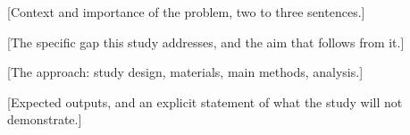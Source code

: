 

{[}Context and importance of the problem, two to three sentences.]

{[}The specific gap this study addresses, and the aim that follows from it.]

{[}The approach: study design, materials, main methods, analysis.]

{[}Expected outputs, and an explicit statement of what the study will not demonstrate.]
